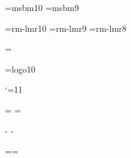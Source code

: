 






\font\tenbb=msbm10  \let\bbold\tenbb %
\font\ninebb=msbm9

\font\tenrm=rm-lmr10 
\font\ninerm=rm-lmr9 
\font\eightrm=rm-lmr8

\def\tenpoint{\lmfonts \textfont0=\tenrm}
\def\ninepoint{\lmixfonts \textfont0=\ninerm
 \skewchar\lmixmi='177 \skewchar\lmixsy='60 }
\def\eightpt{\lmviiifonts \textfont0=\eightrm 
 \skewchar\viiiscriptmi='177 \skewchar\viiiscriptsy='60 }
\tenpoint\lmtitles\ansifont

\def\tttext{\tt\frenchspacing
 \spaceskip=.5em plus.25em minus.15em\relax}

\font\logo=logo10 \def\METAFONT{{\logo METAFONT}}

\def\pdfRed{\pdfliteral{0 1 1 0 k}}
\def\pdfBlack{\pdfliteral{0 0 0 1 k}}
\def\pdfWhite{\pdfliteral{0 0 0 0 k}}

\catcode`\@=11


\newdimen\hpage \newdimen\vpage 

\let\docinfo\relax \let\infodoc\relax

\headline={\hfil}
\footline={\tenrm\ifodd\pageno \docinfo\hfil\folio
            \else \folio\hfil\infodoc \fi\strut}

\hpage=14cm \hsize=25pc %
 \hoffset\hpage \advance\hoffset-\hsize \divide{}
 \advance\hoffset-1in
\vpage=22cm \baselineskip \advance\vsize\topskip %
 \voffset\vpage \advance\voffset-\vsize \advance{}\baselineskip
 \divide{} \advance\voffset-1in

\pdfcode \pdfpageheight=\vpage \pdfpagewidth=\hpage \pdfendcode


\def\breakif#1{\vskip#1\baselineskip \penalty-250 \vskip-#1\baselineskip}

\def\RED{\ifx\Yellow\relax\else
 \hbox to0pt{\Yellow\vrule width20pt height8pt depth2pt\Black\hss}\fi}



\def\em{\ifdim \fontdimen1\font>0pt \rm
 \else \it \expandafter\aftergroup \fi \itcor}
\def\itcor{\ifhmode \expandafter\itpuncl@ok \fi}
\def\itpuncl@ok{\begingroup\futurelet\ITCt@mpa\itcort@st}
\def\itcort@st{\def\ITCt@mpb{\ITCt@mpa}%
 \ifcat\noexpand\ITCt@mpa,\setbox0=\hbox{\ITCt@mpb}%
  \ifdim\ht0<0.3ex \let\itc@rdo=\endgroup \fi\fi \itc@rdo}
\def\itc@rdo{\skip0=\lastskip \ifdim\skip0=0pt \/\else
 \unskip \/\hskip\skip0 \fi \endgroup}

